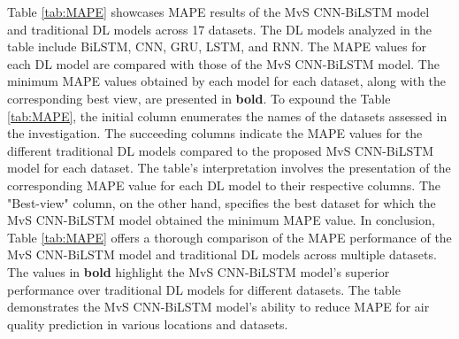 \documentclass[a4paper,fleqn]{cas-sc}
\begin{document}
Table \ref{tab:MAPE} showcases MAPE results of the MvS CNN-BiLSTM model and traditional DL models across 17 datasets. The DL models analyzed in the table include BiLSTM, CNN, GRU, LSTM, and RNN. The MAPE values for each DL model are compared with those of the MvS CNN-BiLSTM model. The minimum MAPE values obtained by each model for each dataset, along with the corresponding best view, are presented in \textbf{bold}. To expound the Table \ref{tab:MAPE}, the initial column enumerates the names of the datasets assessed in the investigation. The succeeding columns indicate the MAPE values for the different traditional DL models compared to the proposed MvS CNN-BiLSTM model for each dataset. The table's interpretation involves the presentation of the corresponding MAPE value for each DL model to their respective columns. The "Best-view" column, on the other hand, specifies the best dataset for which the MvS CNN-BiLSTM model obtained the minimum MAPE value. In conclusion, Table \ref{tab:MAPE} offers a thorough comparison of the MAPE performance of the MvS CNN-BiLSTM model and traditional DL models across multiple datasets. The values in \textbf{bold} highlight the MvS CNN-BiLSTM model's superior performance over traditional DL models for different datasets. The table demonstrates the MvS CNN-BiLSTM model's ability to reduce MAPE for air quality prediction in various locations and datasets.
\end{document}
